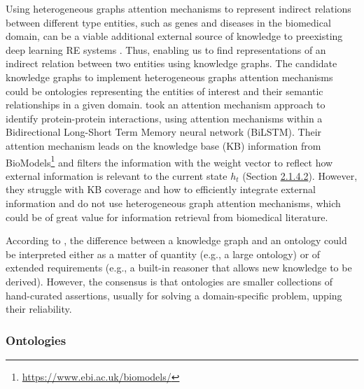 Using heterogeneous graphs attention mechanisms to represent indirect relations between different type entities, such as genes and diseases in the biomedical domain, can be a viable additional external source of knowledge to preexisting deep learning RE systems \citep{wu2020comprehensive}. Thus, enabling us to find representations of an indirect relation between two entities using knowledge graphs. The candidate knowledge graphs to implement heterogeneous graphs attention mechanisms could be ontologies representing the entities of interest and their semantic relationships in a given domain. \cite{li2020bio} took an attention mechanism approach to identify protein-protein interactions, using attention mechanisms within a Bidirectional Long-Short Term Memory neural network (BiLSTM). Their attention mechanism leads on the knowledge base (KB) information from BioModels\footnote{\url{https://www.ebi.ac.uk/biomodels/}} and filters the information with the weight vector to reflect how external information is relevant to the current state $h_t$ (Section \hyperlink{2.1.4.2}{2.1.4.2}). However, they struggle with KB coverage and how to efficiently integrate external information and do not use heterogeneous graph attention mechanisms, which could be of great value for information retrieval from biomedical literature. 

According to \cite{ehrlinger2016towards}, the difference between a knowledge graph and an ontology could be interpreted either as a matter of quantity (e.g., a large ontology) or of extended requirements (e.g., a built-in reasoner that allows new knowledge to be derived). However, the consensus is that ontologies are smaller collections of hand-curated assertions, usually for solving a domain-specific problem, upping their reliability. 

\subsubsection{Ontologies}

